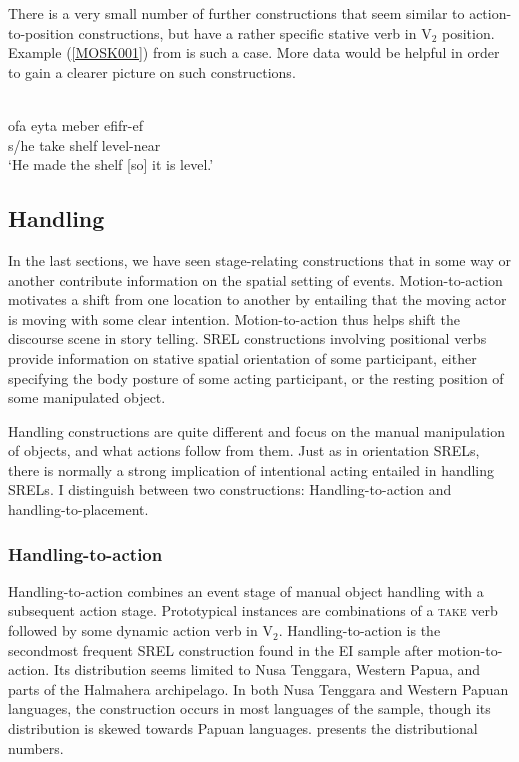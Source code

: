 There is a very small number of further constructions that seem similar to action-to-position constructions, but have a rather specific stative verb in V$_2$ position. Example (\ref{MOSK001}) from  is such a case. More data would be helpful in order to gain a clearer picture on such constructions.

\ea \label{MOSK001}
\\
\gll ofa eyta meber efifr-ef \\
s/he take shelf level-near \\
\glft ‘He made the shelf [so] it is level.’\\ 
\z

\subsection{Handling}

In the last sections, we have seen stage-relating constructions that in some way or another contribute information on the spatial setting of events. Motion-to-action motivates a shift from one location to another by entailing that the moving actor is moving with some clear intention. Motion-to-action thus helps shift the discourse scene in story telling. SREL constructions involving positional verbs provide information on stative spatial orientation of some participant, either specifying the body posture of some acting participant, or the resting position of some manipulated object. 

Handling constructions are quite different and focus on the manual manipulation of objects, and what actions follow from them. Just as in orientation SRELs, there is normally a strong implication of intentional acting entailed in handling SRELs. I distinguish between two constructions: Handling-to-action and handling-to-placement. 

\subsubsection{Handling-to-action} \label{sec:handling-to-action}

Handling-to-action combines an event stage of manual object handling with a subsequent action stage. Prototypical instances are combinations of a \textsc{take} verb followed by some dynamic action verb in V$_2$. Handling-to-action is the secondmost frequent SREL construction found in the EI sample after motion-to-action. Its distribution seems limited to Nusa Tenggara, Western Papua, and parts of the Halmahera archipelago. In both Nusa Tenggara and Western Papuan languages, the construction occurs in most languages of the sample, though its distribution is skewed towards Papuan languages.  presents the distributional numbers.

